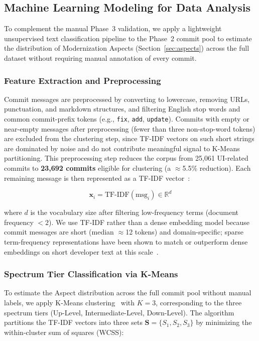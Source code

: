\documentclass{article}
\begin{document}
\subsection{Machine Learning Modeling for Data Analysis}
\label{sec:ml-pipeline}

To complement the manual Phase~3 validation, we apply a lightweight
unsupervised text classification pipeline to the Phase~2 commit pool to
estimate the distribution of Modernization Aspects
(Section~\ref{sec:aspects}) across the full dataset without requiring
manual annotation of every commit.

\subsubsection{Feature Extraction and Preprocessing}
\label{sec:preprocessing}

Commit messages are preprocessed by converting to lowercase, removing
URLs, punctuation, and markdown structures, and filtering English stop
words and common commit-prefix tokens (e.g., \texttt{fix}, \texttt{add},
\texttt{update}). Commits with empty or near-empty messages after
preprocessing (fewer than three non-stop-word tokens) are excluded from
the clustering step, since TF-IDF vectors on such short strings are
dominated by noise and do not contribute meaningful signal to K-Means
partitioning. This preprocessing step reduces the corpus from 25,061
UI-related commits to \textbf{23,692 commits} eligible for clustering
(a $\approx$5.5\% reduction). Each remaining message is then represented
as a TF-IDF vector~\cite{salton1988}:

\begin{equation}
    \mathbf{x}_i = \text{TF-IDF}(\text{msg}_i) \in \mathbb{R}^d
\end{equation}

where $d$ is the vocabulary size after filtering low-frequency terms
(document frequency $< 2$). We use TF-IDF rather than a dense embedding
model because commit messages are short (median $\approx$12 tokens) and
domain-specific; sparse term-frequency representations have been shown to
match or outperform dense embeddings on short developer text at this
scale~\cite{lamine2022understanding}.

\subsubsection{Spectrum Tier Classification via K-Means}

To estimate the Aspect distribution across the full commit pool without
manual labels, we apply K-Means clustering~\cite{macqueen1967} with
$K=3$, corresponding to the three spectrum tiers (Up-Level,
Intermediate-Level, Down-Level). The algorithm partitions the TF-IDF
vectors into three sets $\mathbf{S} = \{S_1, S_2, S_3\}$ by minimizing
the within-cluster sum of squares (WCSS):
\end{document}
